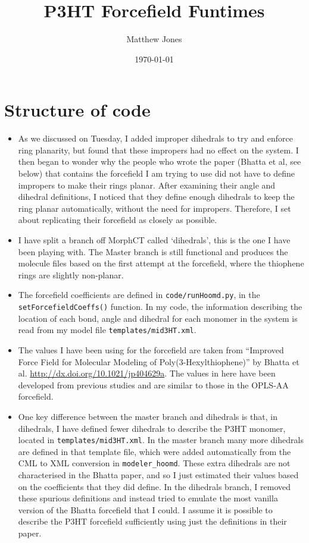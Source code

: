 \documentclass[12pt]{article}
\title{P3HT Forcefield Funtimes}
\author{Matthew Jones}
\date{\today}
\begin{document}
\maketitle

\section{Structure of code}

\begin{itemize}
\item{As we discussed on Tuesday, I added improper dihedrals to try and enforce ring planarity, but found that these impropers had no effect on the system. I then began to wonder why the people who wrote the paper (Bhatta et al, see below) that contains the forcefield I am trying to use did not have to define impropers to make their rings planar. After examining their angle and dihedral definitions, I noticed that they define enough dihedrals to keep the ring planar automatically, without the need for impropers. Therefore, I set about replicating their forcefield as closely as possible.}
\item{I have split a branch off MorphCT called `dihedrals', this is the one I have been playing with. The Master branch is still functional and produces the molecule files based on the first attempt at the forcefield, where the thiophene rings are slightly non-planar.}
\item{The forcefield coefficients are defined in \verb|code/runHoomd.py|, in the \verb|setForcefieldCoeffs()| function. In my code, the information describing the location of each bond, angle and dihedral for each monomer in the system is read from my model file \verb|templates/mid3HT.xml|.}
\item{The values I have been using for the forcefield are taken from ``Improved Force Field for Molecular Modeling of Poly(3-Hexylthiophene)'' by Bhatta et al. \url{http://dx.doi.org/10.1021/jp404629a}. The values in here have been developed from previous studies and are similar to those in the OPLS-AA forcefield.}
\item{One key difference between the master branch and dihedrals is that, in dihedrals, I have defined fewer dihedrals to describe the P3HT monomer, located in \verb|templates/mid3HT.xml|. In the master branch many more dihedrals are defined in that template file, which were added automatically from the CML to XML conversion in \verb|modeler_hoomd|. These extra dihedrals are not characterised in the Bhatta paper, and so I just estimated their values based on the coefficients that they did define. In the dihedrals branch, I removed these spurious definitions and instead tried to emulate the most vanilla version of the Bhatta forcefield that I could. I assume it is possible to describe the P3HT forcefield sufficiently using just the definitions in their paper.}
\end{itemize}
\end{document}
